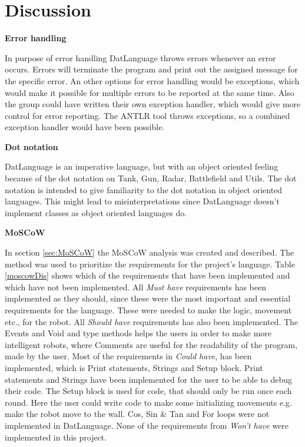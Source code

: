 \chapter{Discussion}
\label{chap:Discussion}


\textbf{\LARGE{Error handling}}

In purpose of error handling DatLanguage throws errors whenever an error occurs. Errors will terminate the program and print out the assigned message for the specific error.
An other options for error handling would be exceptions, which would make it possible for multiple errors to be reported at the same time. Also the group could have written their own exception handler, which would give more control for error reporting. The ANTLR tool throws exceptions, so a combined exception handler would have been possible. \newline

\textbf{\LARGE{Dot notation}}

DatLanguage is an imperative language, but with an object oriented feeling because of the dot notation on Tank, Gun, Radar, Battlefield and Utils. The dot notation is intended to give familiarity to the dot notation in object oriented languages. This might lead to misinterpretations since DatLanguage doesn't implement classes as object oriented languages do. 

\textbf{\LARGE{MoSCoW}}

In section \ref{sec:MoSCoW} the MoSCoW analysis was created and described. The method was used to prioritize the requirements for the project's language. Table \ref{moscowDis} shows which of the requirements that have been implemented and which have not been implemented. \newline
All \textit{Must have} requirements has been implemented as they should, since these were the most important and essential requirements for the language. These were needed to make the logic, movement etc., for the robot. \newline
All \textit{Should have} requirements has also been implemented. The Events and Void and type methods helps the users in order to make more intelligent robots, where Comments are useful for the readability of the program, made by the user. \newline
Most of the requirements in \textit{Could have}, has been implemented, which is Print statements, Strings and Setup block. Print statements and Strings have been implemented for the user to be able to debug their code. The Setup block is used for code, that should only be run once each round. Here the user could write code to make some initializing movements e.g. make the  robot move to the wall. Cos, Sin \& Tan and For loops were not implemented in DatLanguage. \newline
None of the requirements from \textit{Won't have} were implemented in this project.

